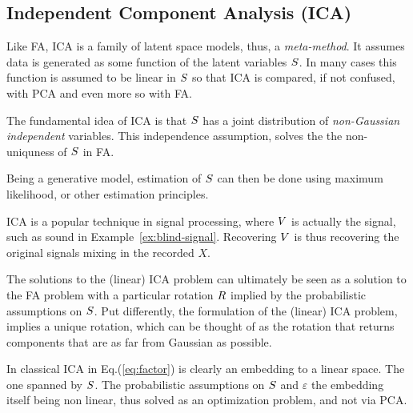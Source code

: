 \documentclass[12pt,a4paper]{article}
\begin{document}
\subsection{Independent Component Analysis (ICA)}
\label{sec:ica}


Like FA, ICA is a family of latent space models, thus, a \emph{meta-method}.
It assumes data is generated as some function of the latent variables $S$. 
In many cases this function is assumed to be linear in $S$ so that ICA is compared, if not confused, with PCA and even more so with FA. 

The fundamental idea of ICA is that $S$ has a joint distribution of \emph{non-Gaussian independent} variables. 
This independence assumption, solves the the non-uniquness of $S$ in FA.

Being a generative model, estimation of $S$ can then be done using maximum likelihood, or other estimation principles. 

ICA is a popular technique in signal processing, where $V$ is actually the signal, such as sound in Example~\ref{ex:blind-signal}.
Recovering $V$ is thus recovering the original signals mixing in the recorded $X$. 



\begin{remark}
	The solutions to the (linear) ICA problem can ultimately be seen as a solution to the FA problem with a particular rotation $R$ implied by the probabilistic assumptions on $S$.
	Put differently, the formulation of the (linear) ICA problem, implies a unique rotation, which can be thought of as the rotation that returns components that are as far from Gaussian as possible. 
\end{remark}


\begin{remark}
	In classical ICA in Eq.(\ref{eq:factor}) is clearly an embedding to a linear space. 
	The one spanned by $S$. 
	The probabilistic assumptions on $S$ and $\varepsilon$ the embedding itself being non linear, thus solved as an optimization problem, and not via PCA. 
\end{remark}
\end{document}
